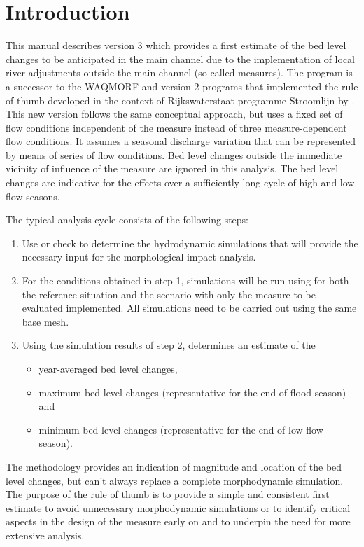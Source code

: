 \chapter{Introduction}

This manual describes \dfastmi version 3 which provides a first estimate of the bed level changes to be anticipated in the main channel due to the implementation of local river adjustments outside the main channel (so-called measures).
The program is a successor to the WAQMORF and \dfastmi version 2 programs that implemented the rule of thumb developed in the context of Rijkswaterstaat programme Stroomlijn by \citep{Sieben2008}.
This new version follows the same conceptual approach, but uses a fixed set of flow conditions independent of the measure instead of three measure-dependent flow conditions.
It assumes a seasonal discharge variation that can be represented by means of series of flow conditions.
Bed level changes outside the immediate vicinity of influence of the measure are ignored in this analysis.
The bed level changes are indicative for the effects over a sufficiently long cycle of high and low flow seasons.

The typical analysis cycle consists of the following steps:

\begin{enumerate}
\item Use \dfastmi or check  to determine the hydrodynamic simulations that will provide the necessary input for the morphological impact analysis.

\item For the conditions obtained in step 1, simulations will be run using \dflowfm for both the reference situation and the scenario with only the measure to be evaluated implemented.
All simulations need to be carried out using the same base mesh.

\item Using the simulation results of step 2, \dfastmi determines an estimate of the
\begin{itemize}
\item year-averaged bed level changes,
\item maximum bed level changes (representative for the end of flood season) and
\item minimum bed level changes (representative for the end of low flow season).
\end{itemize}
\end{enumerate}

The methodology provides an indication of magnitude and location of the bed level changes, but can't always replace a complete morphodynamic simulation.
The purpose of the rule of thumb is to provide a simple and consistent first estimate to avoid unnecessary morphodynamic simulations or to identify critical aspects in the design of the measure early on and to underpin the need for more extensive analysis.


